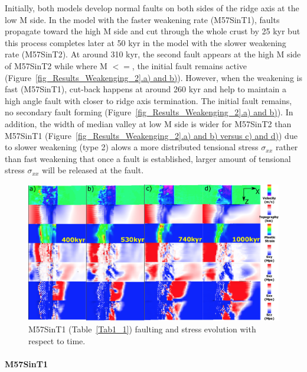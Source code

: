 Initially, both models develop normal faults on both sides of the ridge axis at the low M side. In the model with the faster weakening rate (M57SinT1), faults propagate toward the high M side and cut through the whole crust by 25 kyr but this process completes later at 50 kyr in the model with the slower weakening rate (M57SinT2). At around 310 kyr, the second fault appears at the high M side of M57SinT2 while where M $<=$, the initial fault remains active (Figure~\hyperref[fig_Results_Weakenging_2]{\ref{fig_Results_Weakenging_2}.a) and b)}). However, when the weakening is fast (M57SinT1), cut-back happens at around 260 kyr and help to maintain a high angle fault with closer to ridge axis termination. The initial fault remains, no secondary fault forming (Figure~\hyperref[fig_Results_Weakenging_2]{\ref{fig_Results_Weakenging_2}.a) and b)}). In addition, the width of median valley at low M side is wider for M57SinT2 than M57SinT1 (Figure~\hyperref[fig_Results_Weakenging_2]{\ref{fig_Results_Weakenging_2}.a) and b) versus c) and d)}) due to slower weakening (type 2) alows a more distributed tensional stress $\sigma_{xx}$ rather than fast weakening that once a fault is established, larger amount of tensional stress $\sigma_{xx}$ will be released at the fault.  

\begin{figure}[h]
 \centering
  \includegraphics[width=1.0\textwidth]{./Figures/fig_Results_Weakening_3_M57SinT1_time_evolution.eps}
 \caption{M57SinT1 (Table~\hyperref[Tab1_1]{\ref{Tab1_1}}) faulting and stress evolution with respect to time.}
\label{fig_Results_Weakenging_3}
\end{figure}

\paragraph{M57SinT1}\label{para_M57SinT1}

